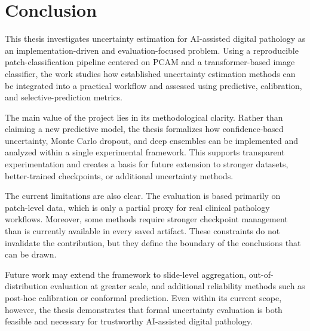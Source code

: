 \chapter{Conclusion}
\label{chap:conclusion}

This thesis investigates uncertainty estimation for AI-assisted digital pathology as an implementation-driven and evaluation-focused problem. Using a reproducible patch-classification pipeline centered on PCAM and a transformer-based image classifier, the work studies how established uncertainty estimation methods can be integrated into a practical workflow and assessed using predictive, calibration, and selective-prediction metrics.

The main value of the project lies in its methodological clarity. Rather than claiming a new predictive model, the thesis formalizes how confidence-based uncertainty, Monte Carlo dropout, and deep ensembles can be implemented and analyzed within a single experimental framework. This supports transparent experimentation and creates a basis for future extension to stronger datasets, better-trained checkpoints, or additional uncertainty methods.

The current limitations are also clear. The evaluation is based primarily on patch-level data, which is only a partial proxy for real clinical pathology workflows. Moreover, some methods require stronger checkpoint management than is currently available in every saved artifact. These constraints do not invalidate the contribution, but they define the boundary of the conclusions that can be drawn.

Future work may extend the framework to slide-level aggregation, out-of-distribution evaluation at greater scale, and additional reliability methods such as post-hoc calibration or conformal prediction. Even within its current scope, however, the thesis demonstrates that formal uncertainty evaluation is both feasible and necessary for trustworthy AI-assisted digital pathology.

